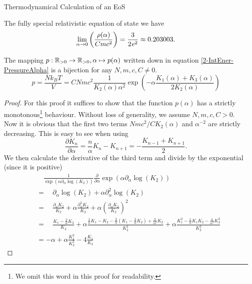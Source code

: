 \begin{section}{Thermodynamical Calculation of an EoS}
\begin{subsection}{The fully special relativistic equation of state}
we have
\begin{equation}
	\lim\limits_{\alpha\to0}\left(\frac{\rho(\alpha)}{Cmc^2}\right) = \frac{3}{2\mathit{e}^2} \approx 0.203003.
\end{equation}
%
%
\begin{theorem}
	The mapping $p:\mathbb{R}_{>0}\rightarrow \mathbb{R}_{>0},\alpha\mapsto p(\alpha)$ written down in equation \eqref{2-IntEner-PressureAlpha} is a bijection for any $N,m,c,C\neq0$.
	\begin{equation}
		p = \frac{Nk_BT}{V} = CNmc^2\frac{1}{K_2(\alpha)\alpha^2}\exp\left(-\alpha\frac{K_1(\alpha)+K_3(\alpha)}{2K_2(\alpha)}\right)
	\end{equation}
\end{theorem}
\begin{proof}
	For this proof it suffices to show that the function $p(\alpha)$ has a strictly monotonous\footnote{We omit this word in this proof for readability.} behaviour. Without loss of generality, we assume $N,m,c,C>0$. Now it is obvious that the first two terms $Nmc^2/CK_2(\alpha)$ and $\alpha^{-2}$ are strictly decreasing. This is easy to see when using \cite{abramowitzPocketbookMathematicalFunctions1984}
	\begin{equation}
		\frac{\partial K_n}{\partial\alpha} = \frac{n}{\alpha}K_n-K_{n+1} = -\frac{K_{n-1}+K_{n+1}}{2}.
		\label{2-IntEner-BesselDerivative}
	\end{equation}
	We then calculate the derivative of the third term and divide by the exponential (since it is positive)
	\begin{align}
		&\hspace{1em} \frac{1}{\exp(\alpha\partial_\alpha\log(K_2))}\frac{\partial}{\partial\alpha}\exp(\alpha\partial_\alpha\log(K_2))\\
		&= \hspace{1em} \partial_\alpha\log(K_2) + \alpha\partial^2_\alpha\log(K_2)\\
		&= \hspace{1em} \frac{\partial_\alpha K_2}{K_2} + \alpha\frac{\partial^2_\alpha K_2}{K_2} + \alpha\left(\frac{\partial_\alpha K_2}{K_2}\right)^2\\
		&= \hspace{1em} \frac{K_1-\frac{2}{\alpha}K_2}{K_2} + \alpha\frac{\frac{1}{\alpha}K_1-K_2-\frac{2}{\alpha}\left(K_1-\frac{2}{\alpha}K_2\right)+\frac{2}{\alpha^2}K_2}{K_2^2} + \alpha\frac{K_1^2-\frac{1}{\alpha}K_1K_2-\frac{4}{\alpha^2}K_2^2}{K_2^2}\\
		&= -\alpha + \alpha\frac{K_1^2}{K_2^2} - 4\frac{K_1}{K_2}

\end{align}
\end{proof}
\end{subsection}
\end{section}
